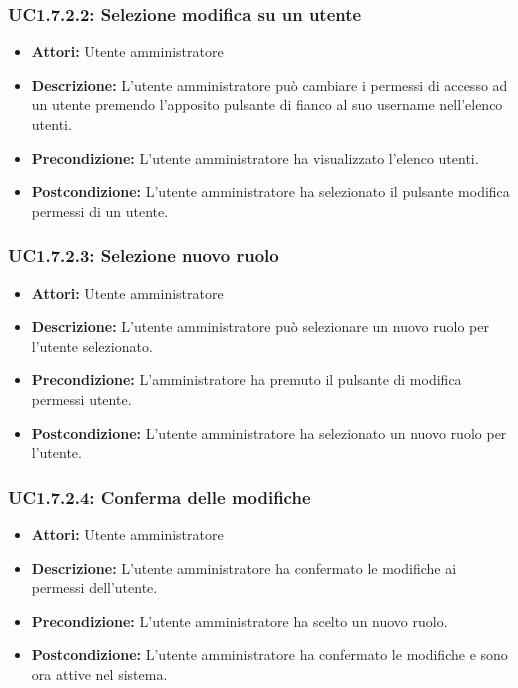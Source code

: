 \subsubsection{UC1.7.2.2: Selezione modifica su un utente}

\begin{itemize}
    \item \textbf{Attori:} Utente amministratore
    \item \textbf{Descrizione:} L'utente amministratore può cambiare i permessi di accesso ad un utente premendo l'apposito pulsante di fianco al suo username nell'elenco utenti.
    \item \textbf{Precondizione:} L'utente amministratore ha visualizzato l'elenco utenti.
    \item \textbf{Postcondizione:} L'utente amministratore ha selezionato il pulsante modifica permessi di un utente.
\end{itemize}

\subsubsection{UC1.7.2.3: Selezione nuovo ruolo}

\begin{itemize}
    \item \textbf{Attori:} Utente amministratore
    \item \textbf{Descrizione:} L'utente amministratore può selezionare un nuovo ruolo per l'utente selezionato.
    \item \textbf{Precondizione:} L'amministratore ha premuto il pulsante di modifica permessi utente.
    \item \textbf{Postcondizione:} L'utente amministratore ha selezionato un nuovo ruolo per l'utente.
\end{itemize}

\subsubsection{UC1.7.2.4: Conferma delle modifiche}

\begin{itemize}
    \item \textbf{Attori:} Utente amministratore
    \item \textbf{Descrizione:} L'utente amministratore ha confermato le modifiche ai permessi dell'utente.
    \item \textbf{Precondizione:} L'utente amministratore ha scelto un nuovo ruolo.
    \item \textbf{Postcondizione:} L'utente amministratore ha confermato le modifiche e sono ora attive nel sistema.
\end{itemize}

